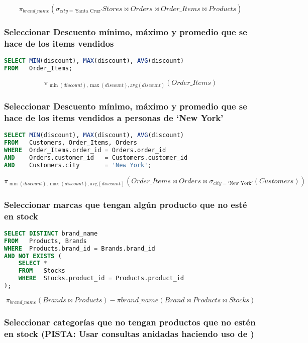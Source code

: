 \[\pi_{brand\_name}(\sigma_{city='\text{Santa Cruz}'}Stores\bowtie Orders\bowtie Order\_Items\bowtie Products)\]

\subsubsection{Seleccionar Descuento mínimo, máximo y promedio que se hace de los items vendidos}

\begin{lstlisting}[language=SQL]
SELECT MIN(discount), MAX(discount), AVG(discount)
FROM   Order_Items;
\end{lstlisting}

\[\pi_{\min(discount),\max(discount),\text{avg}(discount)}(Order\_Items)\]

\subsubsection{Seleccionar Descuento mínimo, máximo y promedio que se hace de los items vendidos a personas de `New York'}

\begin{lstlisting}[language=SQL]
SELECT MIN(discount), MAX(discount), AVG(discount)
FROM   Customers, Order_Items, Orders
WHERE  Order_Items.order_id = Orders.order_id
AND    Orders.customer_id   = Customers.customer_id
AND    Customers.city       = 'New York';
\end{lstlisting}

\[\pi_{\min(discount),\max(discount),\text{avg}(discount)}(Order\_Items\bowtie Orders\bowtie\sigma_{city='\text{New York}'}(Customers))\]

\subsubsection{Seleccionar marcas que tengan algún producto que no esté en stock}

\begin{lstlisting}[language=SQL]
SELECT DISTINCT brand_name
FROM   Products, Brands
WHERE  Products.brand_id = Brands.brand_id
AND NOT EXISTS (
	SELECT *
	FROM   Stocks
	WHERE  Stocks.product_id = Products.product_id
);
\end{lstlisting}

\[\pi_{brand\_name}(Brands\bowtie Products)-\pi{brand\_name}(Brand\bowtie Products\bowtie Stocks)\]

\subsubsection{Seleccionar categorías que no tengan productos que no estén en stock (PISTA\@: Usar consultas anidadas haciendo uso de )}

